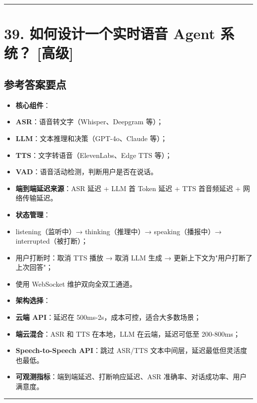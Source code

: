 \documentclass[9pt,a4paper,twocolumn]{ctexart}
\newcommand{\lvgao}{\usebox{\badgegaobox}}
\def\lvgao{[高级]}%
\begin{document}
\vspace{2pt}
\noindent\rule{\columnwidth}{0.3pt}\vspace{2pt}



\section*{39. 如何设计一个实时语音 Agent 系统？ \lvgao{}}


\subsection*{参考答案要点}

\begin{itemize}[itemsep=1pt, topsep=2pt]
  \item \textbf{核心组件}：
  \item \textbf{ASR}：语音转文字（Whisper、Deepgram 等）；
  \item \textbf{LLM}：文本推理和决策（GPT-4o、Claude 等）；
  \item \textbf{TTS}：文字转语音（ElevenLabs、Edge TTS 等）；
  \item \textbf{VAD}：语音活动检测，判断用户是否在说话。
  \item \textbf{端到端延迟来源}：ASR 延迟 + LLM 首 Token 延迟 + TTS 首音频延迟 + 网络传输延迟。
  \item \textbf{状态管理}：
  \item listening（监听中）→ thinking（推理中）→ speaking（播报中）→ interrupted（被打断）；
  \item 用户打断时：取消 TTS 播放 → 取消 LLM 生成 → 更新上下文为"用户打断了上次回答"；
  \item 使用 WebSocket 维护双向全双工通道。
  \item \textbf{架构选择}：
  \item \textbf{云端 API}：延迟在 500ms-2s，成本可控，适合大多数场景；
  \item \textbf{端云混合}：ASR 和 TTS 在本地，LLM 在云端，延迟可低至 200-800ms；
  \item \textbf{Speech-to-Speech API}：跳过 ASR/TTS 文本中间层，延迟最低但灵活度也最低。
  \item \textbf{可观测指标}：端到端延迟、打断响应延迟、ASR 准确率、对话成功率、用户满意度。
\end{itemize}


\vspace{2pt}
\noindent\rule{\columnwidth}{0.3pt}\vspace{2pt}
\end{document}
